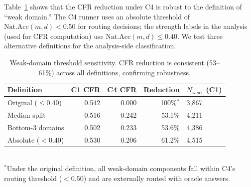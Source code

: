 \documentclass[10pt]{article}
\begin{document}
Table~\ref{tab:threshold} shows that the CFR reduction under C4 is robust to the
definition of ``weak domain.'' The C4 runner uses an absolute threshold of
$\text{Nat.Acc}(m,d) < 0.50$ for routing decisions; the strength labels in the
analysis (used for CFR computation) use $\text{Nat.Acc}(m,d) \leq 0.40$. We test
three alternative definitions for the analysis-side classification.

\begin{table}[h]
\centering
\caption{Weak-domain threshold sensitivity. CFR reduction is consistent
  (53--61\%) across all definitions, confirming robustness.}
\label{tab:threshold}
\small
\begin{tabular}{lrrrl}
\toprule
Definition & C1 CFR & C4 CFR & Reduction & $N_{\text{weak}}$ (C1) \\
\midrule
Original ($\leq 0.40$) & 0.542 & 0.000 & 100\%$^*$ & 3{,}867 \\
Median split & 0.516 & 0.242 & 53.1\% & 4{,}211 \\
Bottom-3 domains & 0.502 & 0.233 & 53.6\% & 4{,}386 \\
Absolute ($< 0.40$) & 0.530 & 0.206 & 61.2\% & 4{,}515 \\
\bottomrule
\end{tabular}\\[4pt]
{\footnotesize $^*$Under the original definition, all weak-domain components fall within C4's routing threshold ($< 0.50$) and are externally routed with oracle answers.}
\end{table}
\end{document}
